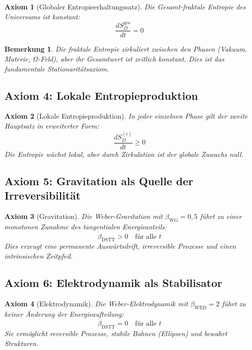 \documentclass[12pt,a4paper]{article}
\newtheorem{axiom}{Axiom}
\newtheorem{bemerkung}{Bemerkung}
\begin{document}
\begin{axiom}[Globaler Entropieerhaltungssatz]
Die Gesamt-fraktale Entropie des Universums ist konstant:
\begin{equation}
\boxed{\frac{dS_D^{\text{ges}}}{dt} = 0}
\end{equation}
\end{axiom}

\begin{bemerkung}
Die fraktale Entropie zirkuliert zwischen den Phasen (Vakuum, Materie, $\Omega$-Feld), aber ihr Gesamtwert ist zeitlich konstant. Dies ist das fundamentale Stationaritätsaxiom.
\end{bemerkung}

\subsection{Axiom 4: Lokale Entropieproduktion}

\begin{axiom}[Lokale Entropieproduktion]
In jeder einzelnen Phase gilt der zweite Hauptsatz in erweiterter Form:
\begin{equation}
\boxed{\frac{dS_D^{(i)}}{dt} \geq 0}
\end{equation}
Die Entropie wächst lokal, aber durch Zirkulation ist der globale Zuwachs null.
\end{axiom}

\subsection{Axiom 5: Gravitation als Quelle der Irreversibilität}

\begin{axiom}[Gravitation]
Die Weber-Gravitation mit $\beta_{\text{WG}} = 0,5$ führt zu einer monotonen Zunahme des tangentialen Energieanteils:
\begin{equation}
\boxed{\dot{\beta}_{\text{DSTT}} > 0 \quad \text{für alle } t}
\end{equation}
Dies erzeugt eine permanente Auswärtsdrift, irreversible Prozesse und einen intrinsischen Zeitpfeil.
\end{axiom}

\subsection{Axiom 6: Elektrodynamik als Stabilisator}

\begin{axiom}[Elektrodynamik]
Die Weber-Elektrodynamik mit $\beta_{\text{WED}} = 2$ führt zu keiner Änderung der Energieaufteilung:
\begin{equation}
\boxed{\dot{\beta}_{\text{DSTT}} = 0 \quad \text{für alle } t}
\end{equation}
Sie ermöglicht reversible Prozesse, stabile Bahnen (Ellipsen) und bewahrt Strukturen.
\end{axiom}
\end{document}
